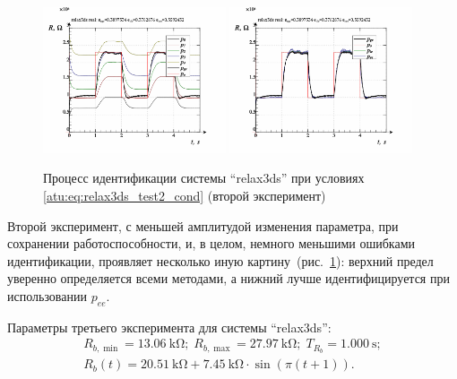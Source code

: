 \begin{figure}[htb!]
  \centerline{
    \includegraphics[width=0.48\textwidth]{p/relax3ds_read_id2_1-p_p.png}
    \hfill
    \includegraphics[width=0.48\textwidth]{p/relax3ds_read_id2_1-p_pp.png}
  }
  \caption{Процесс идентификации системы ``relax3ds'' при условиях \ref{atu:eq:relax3ds_test2_cond} (второй эксперимент)}
  \label{atu:f:relax3ds_id_1}
\end{figure}

Второй эксперимент, с меньшей амплитудой изменения параметра,
при сохранении работоспособности, и, в целом,
немного меньшими ошибками идентификации,
проявляет несколько иную картину~(рис.~\ref{atu:f:relax3ds_id_1}):
верхний предел уверенно определяется всеми методами,
а нижний лучше идентифицируется при использовании
$p_{ee}$.


Параметры третьего эксперимента для системы ``relax3ds'':
%
\begin{equation}
  \begin{array}{c}
    R_{b,\min} = \SI{13.06}{\kilo\ohm};
    \;
    R_{b,\max} = \SI{27.97}{\kilo\ohm};
    \;
    T_{R_b} = \SI{1.000}{\second};
  \\
    R_b(t) = \SI{20.51}{\kilo\ohm} + \SI{7.45}{\kilo\ohm} \cdot \sin( \pi ( t + 1 ) ).
  \end{array}
  \label{atu:eq:relax3ds_test3_cond}
\end{equation}

